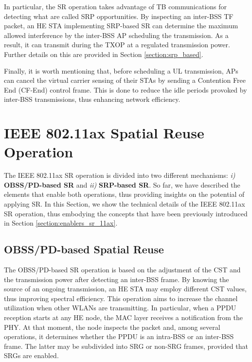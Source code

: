 \documentclass[preprint,12pt]{elsarticle}
\begin{document}
	In particular, the SR operation takes advantage of TB communications for detecting what are called SRP opportunities. By inspecting an inter-BSS TF packet, an HE STA implementing SRP-based SR can determine the maximum allowed interference by the inter-BSS AP scheduling the transmission. As a result, it can transmit during the TXOP at a regulated transmission power. Further details on this are provided in Section \ref{section:srp_based}.
	
	Finally, it is worth mentioning that, before scheduling a UL transmission, APs can cancel the virtual carrier sensing of their STAs by sending a Contention Free End (CF-End) control frame. This is done to reduce the idle periods provoked by inter-BSS transmissions, thus enhancing network efficiency. %
	
	
	\section{IEEE 802.11ax Spatial Reuse Operation}
	\label{section:operation_sr_11ax}
	The IEEE 802.11ax SR operation is divided into two different mechanisms: \emph{i)} \textbf{OBSS/PD-based SR} and \emph{ii)} \textbf{SRP-based SR}. So far, we have described the elements that enable both operations, thus providing insights on the potential of applying SR. In this Section, we show the technical details of the IEEE 802.11ax SR operation, thus embodying the concepts that have been previously introduced in Section \ref{section:enablers_sr_11ax}.
	
	\subsection{OBSS/PD-based Spatial Reuse}
	\label{section:obss_pd_based}
	The OBSS/PD-based SR operation is based on the adjustment of the CST and the transmission power after detecting an inter-BSS frame. By knowing the source of an ongoing transmission, an HE STA may employ different CST values, thus improving spectral efficiency. This operation aims to increase the channel utilization when other WLANs are transmitting. In particular, when a PPDU reception starts at any HE node, the MAC layer receives a notification from the PHY. At that moment, the node inspects the packet and, among several operations, it determines whether the PPDU is an intra-BSS or an inter-BSS frame. The latter may be subdivided into SRG or non-SRG frames, provided that SRGs are enabled.
	
\end{document}
